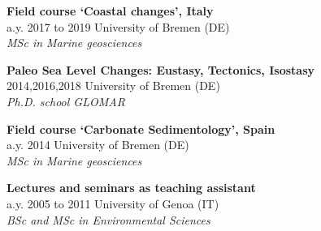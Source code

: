 \documentclass[%
               doublesided,
               paper=a4,
               fontsize=10pt
              ]{my-resume}
\begin{document}
{        \smallskip

    \small{\textbf{Field course ‘Coastal changes’, Italy}\\
    \faCalendar\hspace{0.5em}a.y. 2017 to 2019 \hspace{1em} \faUniversity\hspace{0.5em}University of Bremen (DE)\\
    \faMortarBoard\hspace{0.5em}\textit{MSc in Marine geosciences}}
   
        \smallskip

    \small{\textbf{Paleo Sea Level Changes: Eustasy, Tectonics, Isostasy}\\
    \faCalendar\hspace{0.5em}2014,2016,2018 \hspace{1em} \faUniversity\hspace{0.5em}University of Bremen (DE)\\
    \faMortarBoard\hspace{0.5em}\textit{Ph.D. school GLOMAR}}
 
        \smallskip

    \small{\textbf{Field course ‘Carbonate Sedimentology’, Spain}\\
    \faCalendar\hspace{0.5em}a.y. 2014 \hspace{1em} \faUniversity\hspace{0.5em}University of Bremen (DE)\\
    \faMortarBoard\hspace{0.5em}\textit{MSc in Marine geosciences}}    

    \small{\textbf{Lectures and seminars as teaching assistant}\\
    \faCalendar\hspace{0.5em}a.y. 2005 to 2011 \hspace{1em} \faUniversity\hspace{0.5em}University of Genoa (IT)\\
    \faMortarBoard\hspace{0.5em}\textit{BSc and MSc in Environmental Sciences}}    
    
}      
\makebody

                  
\clearpage


\pagestyle{highlightmain}
\end{document}
